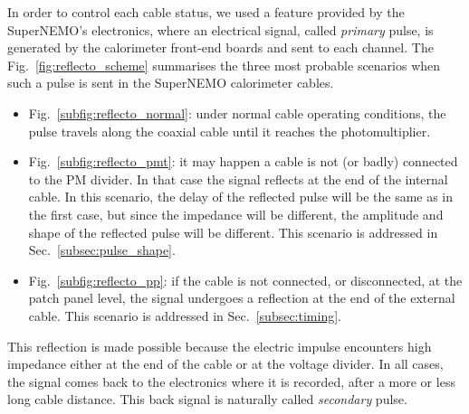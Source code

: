 In order to control each cable status, we used a feature provided by the SuperNEMO's electronics, where an electrical signal, called \emph{primary} pulse, is generated by the calorimeter front-end boards and sent to each channel.
The Fig.~\ref{fig:reflecto_scheme} summarises the three most probable scenarios when such a pulse is sent in the SuperNEMO calorimeter cables.
\begin{itemize}
\item Fig.~\ref{subfig:reflecto_normal}: under normal cable operating conditions, the pulse travels along the coaxial cable until it reaches the photomultiplier.
\item Fig.~\ref{subfig:reflecto_pmt}: it may happen a cable is not (or badly) connected to the PM divider.
  In that case the signal reflects at the end of the internal cable.
  In this scenario, the delay of the reflected pulse will be the same as in the first case, but since the impedance will be different, the amplitude and shape of the reflected pulse will be different.
  This scenario is addressed in Sec.~\ref{subsec:pulse_shape}.
\item Fig.~\ref{subfig:reflecto_pp}: if the cable is not connected, or disconnected, at the patch panel level, the signal undergoes a reflection at the end of the external cable.
  This scenario is addressed in Sec.~\ref{subsec:timing}.
\end{itemize}
This reflection is made possible because the electric impulse encounters high impedance either at the end of the cable or at the voltage divider.
In all cases, the signal comes back to the electronics where it is recorded, after a more or less long cable distance.
This back signal is naturally called \emph{secondary} pulse.
